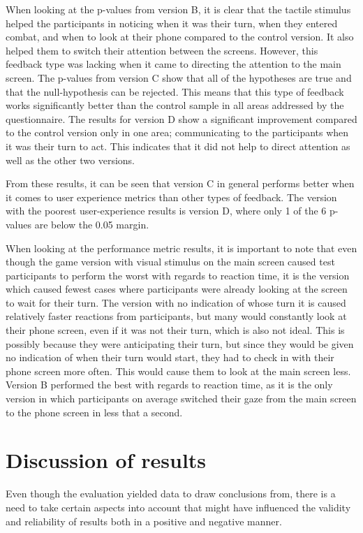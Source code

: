 When looking at the p-values from version B, it is clear that the tactile stimulus helped the participants in noticing when it was their turn, when they entered combat, and when to look at their phone compared to the control version. It also helped them to switch their attention between the screens. However, this feedback type was lacking when it came to directing the attention to the main screen. 
The p-values from version C show that all of the hypotheses are true and that the null-hypothesis can be rejected. This means that this type of feedback works significantly better than the control sample in all areas addressed by the questionnaire.
The results for version D show a significant improvement compared to the control version only in one area; communicating to the participants when it was their turn to act. This indicates that it did not help to direct attention as well as the other two versions. 

From these results, it can be seen that version C in general performs better when it comes to user experience metrics than other types of feedback. The version with the poorest user-experience results is version D, where only 1 of the 6 p-values are below the 0.05 margin.

When looking at the performance metric results, it is important to note that even though the game version with visual stimulus on the main screen caused test participants to perform the worst with regards to reaction time, it is the version which caused fewest cases where participants were already looking at the screen to wait for their turn. The version with no indication of whose turn it is caused relatively faster reactions from participants, but many would constantly look at their phone screen, even if it was not their turn, which is also not ideal. This is possibly because they were anticipating their turn, but since they would be given no indication of when their turn would start, they had to check in with their phone screen more often. This would cause them to look at the main screen less. Version B performed the best with regards to reaction time, as it is the only version in which participants on average switched their gaze from the main screen to the phone screen in less that a second.

\section{Discussion of results}
Even though the evaluation yielded data to draw conclusions from, there is a need to take certain aspects into account that might have influenced the validity and reliability of results both in a positive and negative manner. 


